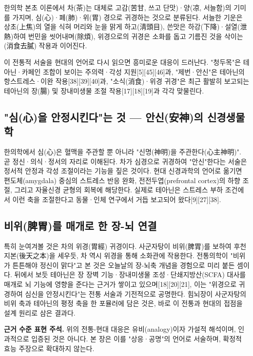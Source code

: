 \documentclass[12pt,oneside]{book}
\newenvironment{authnote}
  {\par\smallskip\begingroup\leftskip=6mm\rightskip=3mm\small\color{muted}\noindent\ignorespaces}
  {\par\endgroup\smallskip}
\begin{document}
한의학 본초 이론에서 차(茶)는 대체로 고감(苦甘, 쓰고 단맛)·양(凉, 서늘함)의 기미를 가지며, 심(心)·폐(肺)·위(胃) 경으로 귀경하는 것으로 분류된다. 서늘한 기운은 상초(上焦)의 열을 식혀 머리와 눈을 맑게 하고(淸頭目), 쓴맛은 하강(下降)·설열(泄熱)하여 번민을 씻어내며(除煩), 위경으로의 귀경은 소화를 돕고 기름진 것을 삭이는(消食去膩) 작용과 이어진다.

이 전통적 서술을 현대의 언어로 다시 읽으면 흥미로운 대응이 드러난다. "청두목"은 테아닌·카페인 조합이 보이는 주의력·각성 지원[5][45][46]과, "제번·안신"은 테아닌의 항스트레스·이완 작용[38][39][40]과, "소식(消食)·위경 귀경"은 최근 활발히 보고되는 테아닌의 장(腸) 및 장내미생물 조절 작용[17][18][19]과 각각 맞물린다.

\subsection{"심(心)을 안정시킨다"는 것 — 안신(安神)의 신경생물학}

한의학에서 심(心)은 혈맥을 주관할 뿐 아니라 "신명(神明)을 주관한다(心主神明)". 곧 정신·의식·정서의 자리로 이해된다. 차가 심경으로 귀경하여 "안신"한다는 서술은 정서적 안정과 각성 조절이라는 기능을 짚은 것이다. 현대 신경과학의 언어로 옮기면 편도체(amygdala) 중심의 스트레스 반응 완화, 전전두엽(prefrontal cortex)의 하향 조절, 그리고 자율신경 균형의 회복에 해당한다. 실제로 테아닌은 스트레스 부하 조건에서 이런 축을 조절한다고 동물·인체 연구에서 거듭 보고되어 왔다[9][27][38].

\subsection{비위(脾胃)를 매개로 한 장-뇌 연결}

특히 눈여겨볼 것은 차의 위경(胃經) 귀경이다. 사군자탕이 비위(脾胃)를 보하여 후천지본(後天之本)을 세우듯, 차 역시 위경을 통해 소화관에 작용한다. 전통의학이 "비위가 튼튼해야 정신이 맑다"고 본 것은 오늘날의 장-뇌축 개념을 경험으로 미리 붙든 셈이다. 뒤에서 보듯 테아닌은 장 장벽 기능·장내미생물 조성·단쇄지방산(SCFA) 대사를 매개로 뇌 기능에 영향을 준다는 근거가 쌓이고 있으며[18][20][21], 이는 "위경으로 귀경하여 심신을 안정시킨다"는 전통 서술과 기전적으로 공명한다. 힘뇌장이 사군자탕의 비위 축과 테아닌의 평정 축을 한 포뮬러에 담은 것은, 바로 이 전통과 현대의 접점을 설계 원리로 삼은 결과다.

\begin{authnote}\textbf{근거 수준 표현 주석.} 위의 전통-현대 대응은 유비(analogy)이자 가설적 해석이며, 인과적으로 입증된 것은 아니다. 본 장은 이를 "상응·공명"의 언어로 서술하며, 확정적 효능 주장으로 확대하지 않는다.\end{authnote}
\end{document}
